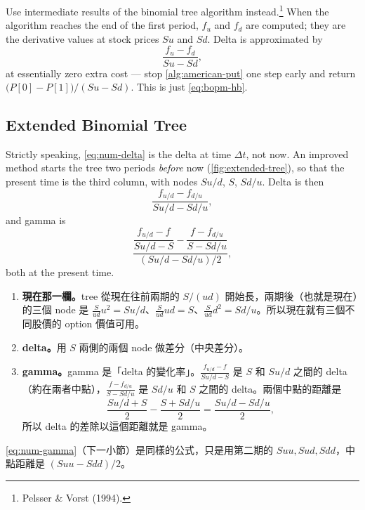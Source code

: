 
Use intermediate results of the binomial tree algorithm instead.\footnote{Pelsser \& Vorst (1994).}
When the algorithm reaches the end of the first period, $f_{u}$ and $f_{d}$ are computed; they are the derivative values at stock prices $Su$ and $Sd$.
Delta is approximated by
\begin{equation}
	\frac{f_{u}-f_{d}}{Su-Sd} ,
	\label{eq:num-delta}
\end{equation}
at essentially zero extra cost --- stop \autoref{alg:american-put} one step early and return $\bigl(P[0]-P[1]\bigr)/(Su-Sd)$.
\suppstart
This is just \eqref{eq:bopm-hb}.

\suppend

\subsection{Extended Binomial Tree}


\suppstart
Strictly speaking, \eqref{eq:num-delta} is the delta at time $\Delta t$, not now.
An improved method starts the tree two periods \emph{before} now (\autoref{fig:extended-tree}), so that the present time is the third column, with nodes $Su/d$, $S$, $Sd/u$.
Delta is then
\[
	\frac{f_{u/d}-f_{d/u}}{Su/d-Sd/u} ,
\]
and gamma is
\[
	\frac{\dfrac{f_{u/d}-f}{Su/d-S}-\dfrac{f-f_{d/u}}{S-Sd/u}}{(Su/d-Sd/u)/2} ,
\]
both at the present time.


\begin{remark}
	\begin{enumerate}[(1),nosep]
		\item \textbf{現在那一欄。}tree 從現在往前兩期的 $S/(ud)$ 開始長，兩期後（也就是現在）的三個 node 是 $\frac{S}{ud}u^{2}=Su/d$、$\frac{S}{ud}ud=S$、$\frac{S}{ud}d^{2}=Sd/u$。所以現在就有三個不同股價的 option 價值可用。
		\item \textbf{delta。}用 $S$ 兩側的兩個 node 做差分（中央差分）。
		\item \textbf{gamma。}gamma 是「delta 的變化率」。$\frac{f_{u/d}-f}{Su/d-S}$ 是 $S$ 和 $Su/d$ 之間的 delta（約在兩者中點），$\frac{f-f_{d/u}}{S-Sd/u}$ 是 $Sd/u$ 和 $S$ 之間的 delta。兩個中點的距離是
		\[
			\frac{Su/d+S}{2}-\frac{S+Sd/u}{2}=\frac{Su/d-Sd/u}{2} ,
		\]
		所以 delta 的差除以這個距離就是 gamma。
	\end{enumerate}
	\eqref{eq:num-gamma}（下一小節）是同樣的公式，只是用第二期的 $Suu,Sud,Sdd$，中點距離是 $(Suu-Sdd)/2$。
\end{remark}
\suppend

